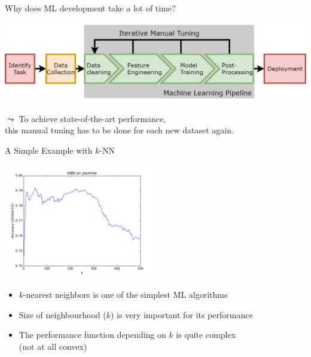 \begin{frame}[c]{Why does ML development take a lot of time?}

\centering
\includegraphics[width=1.0\textwidth]{images/MLPipeline.jpg}

\bigskip\bigskip\bigskip\bigskip
$\leadsto$ To achieve state-of-the-art performance,\\ this manual tuning has to be done for each new dataset again.

\end{frame}
\begin{frame}[c]{A Simple Example with $k$-NN}

\centering
\includegraphics[width=0.5\textwidth]{images/kNN-jasmine}

\begin{itemize}
  \item $k$-nearest neighbors is one of the simplest ML algorithms
  \pause
  \item Size of neighbourhood ($k$) is very important for its performance
  \pause
  \item The performance function depending on $k$ is quite complex\\ (not at all convex)
\end{itemize}

\end{frame}
